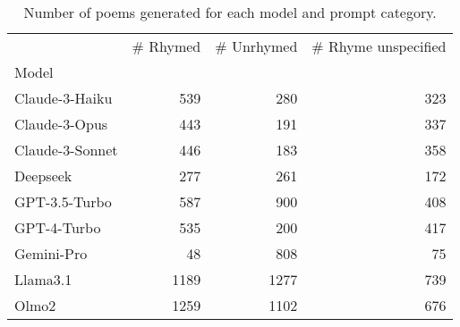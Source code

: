 \begin{table}[H]
  \centering
  \small
  \singlespacing
  \begin{tabular}{lrrr}
  \toprule
   & \# Rhymed & \# Unrhymed & \# Rhyme unspecified \\
  Model &  &  &  \\
  \midrule
  Claude-3-Haiku & 539 & 280 & 323 \\
  Claude-3-Opus & 443 & 191 & 337 \\
  Claude-3-Sonnet & 446 & 183 & 358 \\
  Deepseek & 277 & 261 & 172 \\
  GPT-3.5-Turbo & 587 & 900 & 408 \\
  GPT-4-Turbo & 535 & 200 & 417 \\
  Gemini-Pro & 48 & 808 & 75 \\
  Llama3.1 & 1189 & 1277 & 739 \\
  Olmo2 & 1259 & 1102 & 676 \\
  \bottomrule
  \end{tabular}
  \caption{Number of poems generated for each model and prompt category.}
  \label{tab:num_poems_models}
\end{table}